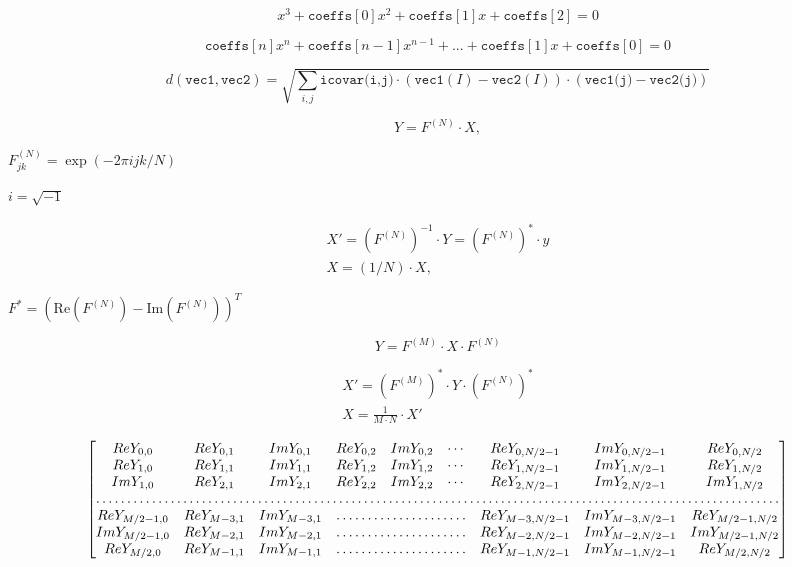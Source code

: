 \documentclass{article}
\begin{document}
\[x^3 + \texttt{coeffs} [0] x^2 + \texttt{coeffs} [1] x + \texttt{coeffs} [2] = 0\]
\pagebreak

\[\texttt{coeffs} [n] x^{n} + \texttt{coeffs} [n-1] x^{n-1} + ... + \texttt{coeffs} [1] x + \texttt{coeffs} [0] = 0\]
\pagebreak

\[d( \texttt{vec1} , \texttt{vec2} )= \sqrt{\sum_{i,j}{\texttt{icovar(i,j)}\cdot(\texttt{vec1}(I)-\texttt{vec2}(I))\cdot(\texttt{vec1(j)}-\texttt{vec2(j)})} }\]
\pagebreak

\[Y = F^{(N)} \cdot X,\]
\pagebreak

$F^{(N)}_{jk}=\exp(-2\pi i j k/N)$
\pagebreak

$i=\sqrt{-1}$
\pagebreak

\[\begin{array}{l} X'= \left (F^{(N)} \right )^{-1} \cdot Y = \left (F^{(N)} \right )^* \cdot y \\ X = (1/N) \cdot X, \end{array}\]
\pagebreak

$F^*=\left(\textrm{Re}(F^{(N)})-\textrm{Im}(F^{(N)})\right)^T$
\pagebreak

\[Y = F^{(M)} \cdot X \cdot F^{(N)}\]
\pagebreak

\[\begin{array}{l} X'= \left (F^{(M)} \right )^* \cdot Y \cdot \left (F^{(N)} \right )^* \\ X = \frac{1}{M \cdot N} \cdot X' \end{array}\]
\pagebreak

\[\begin{bmatrix} Re Y_{0,0} & Re Y_{0,1} & Im Y_{0,1} & Re Y_{0,2} & Im Y_{0,2} & \cdots & Re Y_{0,N/2-1} & Im Y_{0,N/2-1} & Re Y_{0,N/2} \\ Re Y_{1,0} & Re Y_{1,1} & Im Y_{1,1} & Re Y_{1,2} & Im Y_{1,2} & \cdots & Re Y_{1,N/2-1} & Im Y_{1,N/2-1} & Re Y_{1,N/2} \\ Im Y_{1,0} & Re Y_{2,1} & Im Y_{2,1} & Re Y_{2,2} & Im Y_{2,2} & \cdots & Re Y_{2,N/2-1} & Im Y_{2,N/2-1} & Im Y_{1,N/2} \\ \hdotsfor{9} \\ Re Y_{M/2-1,0} & Re Y_{M-3,1} & Im Y_{M-3,1} & \hdotsfor{3} & Re Y_{M-3,N/2-1} & Im Y_{M-3,N/2-1}& Re Y_{M/2-1,N/2} \\ Im Y_{M/2-1,0} & Re Y_{M-2,1} & Im Y_{M-2,1} & \hdotsfor{3} & Re Y_{M-2,N/2-1} & Im Y_{M-2,N/2-1}& Im Y_{M/2-1,N/2} \\ Re Y_{M/2,0} & Re Y_{M-1,1} & Im Y_{M-1,1} & \hdotsfor{3} & Re Y_{M-1,N/2-1} & Im Y_{M-1,N/2-1}& Re Y_{M/2,N/2} \end{bmatrix}\]
\pagebreak
\end{document}
